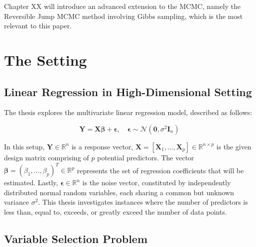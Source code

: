 \documentclass[
  11pt,
]{article}
\begin{document}
Chapter XX will introduce an advanced extension to the MCMC, namely the
Reversible Jump MCMC method involving Gibbs sampling, which is the most
relevant to this paper.

\newpage

\section{The Setting}
  \subsection{Linear Regression in High-Dimensional Setting}

The thesis explores the multivariate linear regression model, described
as follows:

\begin{equation}
\mathbf{Y} = \mathbf{X}\boldsymbol{\beta} + \boldsymbol{\epsilon}, \quad \boldsymbol{\epsilon} \sim \mathcal{N}(\mathbf{0}, \sigma^2\mathbf{I}_n)
\end{equation}

In this setup, \(\mathbf{Y} \in \mathbb{R}^n\) is a response vector,
\(\mathbf{X} = [\mathbf{X}_1, ..., \mathbf{X}_p] \in \mathbb{R}^{n \times p}\)
is the given design matrix comprising of \(p\) potential predictors. The
vector
\(\boldsymbol{\beta} = (\beta_1, ..., \beta_p)^T \in \mathbb{R}^p\)
represents the set of regression coefficients that will be estimated.
Lastly, \(\boldsymbol{\epsilon} \in \mathbb{R}^n\) is the noise vector,
constituted by independently distributed normal random variables, each
sharing a common but unknown variance \(\sigma^2\). This thesis
investigates instances where the number of predictors is less than,
equal to, exceeds, or greatly exceed the number of data points.

\subsection{Variable Selection Problem}
\end{document}
